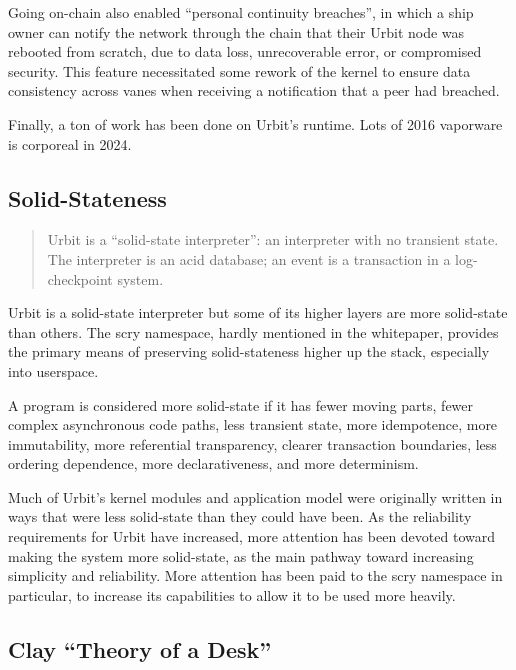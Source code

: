 \documentclass[twoside]{article}
\begin{document}
\sloppy
Going on-chain also enabled ``personal continuity breaches'', in which a ship owner can notify the network through the chain that their Urbit node was rebooted from scratch, due to data loss, unrecoverable error, or compromised security.  This feature necessitated some rework of the kernel to ensure data consistency across vanes when receiving a notification that a peer had breached.

Finally, a ton of work has been done on Urbit's runtime.  Lots of 2016 vaporware is corporeal in 2024.

\subsection{Solid-Stateness}

\begin{quote}
Urbit is a ``solid-state interpreter'': an interpreter with no
transient state.  The interpreter is an {\sc acid} database; an event
is a transaction in a log-checkpoint system.  \citep{Whitepaper}
\end{quote}

Urbit is a solid-state interpreter but some of its higher layers are more solid-state than others.  The scry namespace, hard\-ly mentioned in the whitepaper, provides the primary means of preserving solid-stateness higher up the stack, especially into userspace.

A program is considered more solid-state if it has fewer moving parts, fewer complex asynchronous code paths, less transient state, more idempotence, more immutability, more referential transparency, clearer transaction boundaries, less ordering dependence, more declarativeness, and more determinism.

Much of Urbit's kernel modules and application model were originally written in ways that were less solid-state than they could have been.  As the reliability requirements for Urbit have increased, more attention has been devoted toward making the system more solid-state, as the main pathway toward increasing simplicity and reliability.  More attention has been paid to the scry namespace in particular, to increase its capabilities to allow it to be used more heavily.

\subsection{Clay “Theory of a Desk”}
\end{document}

